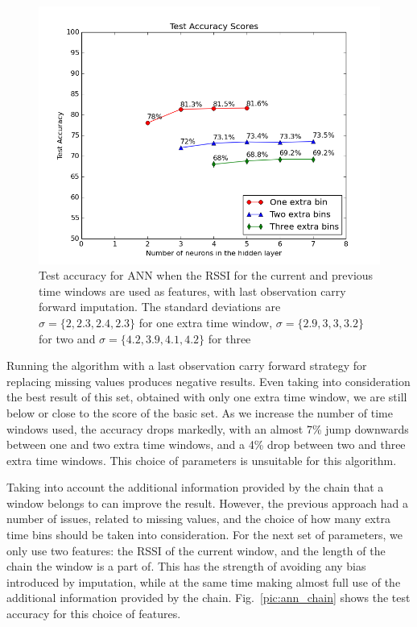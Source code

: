 \begin{figure}[h]
	\begin{center}
		\includegraphics[scale=0.6]{figures/ann_params1.png}
	\end{center}
	
	\caption{Test accuracy for ANN when the RSSI for the current and previous time windows are used as features, with last observation carry forward imputation. The standard deviations are $\sigma=\lbrace 2,2.3,2.4,2.3 \rbrace $ for one extra time window, $\sigma=\lbrace 2.9,3,3,3.2 \rbrace $ for two and $\sigma=\lbrace 4.2,3.9,4.1,4.2 \rbrace $ for three}
	\label{pic:ann_params2}

\end{figure}

Running the algorithm with a last observation carry forward strategy for replacing missing values produces negative results. Even taking into consideration the best result of this set, obtained with only one extra time window, we are still below or close to the score of the basic set.  As we increase the number of time windows used, the accuracy drops markedly, with an almost 7\% jump downwards between one and two extra time windows, and a 4\% drop between two and three extra time windows. This choice of parameters is unsuitable for this algorithm.    

Taking into account the additional information provided by the chain that a window belongs to can improve the result. However, the previous approach had a number of issues, related to missing values, and the choice of how many extra time bins should be taken into consideration. For the next set of parameters, we only use two features: the RSSI of the current window, and the length of the chain the window is a part of. This has the strength of avoiding any bias introduced by imputation, while at the same time making almost full use of the additional information provided by the chain. Fig.~\ref{pic:ann_chain} shows the test accuracy for this choice of features.

